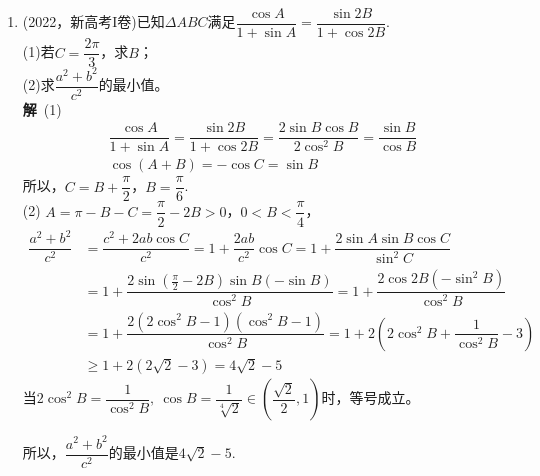 \begin{enumerate}[label={【\textbf{例\thechapter.\arabic*}】},
 leftmargin=\inteval{\myenumleftmargin}pt,
 itemsep=\inteval{\myenumitempsep}pt,
 itemindent=\inteval{\myenumitemindent}pt]
\item (2022，新高考I卷)已知$ \Delta ABC $满足$ \dfrac{\cos A}{1+\sin A}=
\dfrac{\sin 2B}{1+\cos 2B} $. \\
(1)若$ C=\dfrac{2\pi}{3} $，求$ B $；\\
(2)求$ \dfrac{a^{2}+b^{2}}{c^{2}} $的最小值。\\
\textbf{解}\ (1) 
\begin{gather*}
    \dfrac{\cos A}{1+\sin A}=\dfrac{\sin 2B}{1+\cos 2B}=
    \dfrac{2\sin B\cos B}{2\cos^2 B}=\dfrac{\sin B}{\cos B} \\
    \cos(A+B)=-\cos C=\sin B 
\end{gather*}
所以，$ C=B+\dfrac{\pi}{2} $，$ B=\dfrac{\pi}{6} $. \\
(2) $ A=\pi-B-C=\dfrac{\pi}{2}-2B>0 $，$ 0<B<\dfrac{\pi}{4} $，
\begin{align*}
    \dfrac{a^{2}+b^{2}}{c^{2}} &=\dfrac{c^2+2ab\cos C}{c^2}
    =1+\dfrac{2ab}{c^2}\cos C=1+\dfrac{2\sin A\sin B\cos C}{\sin^2 C} \\
    &=1+\dfrac{2\sin(\frac{\pi}{2}-2B)\sin B(-\sin B)}{\cos^2 B}
    =1+\dfrac{2\cos2B(-\sin^2 B)}{\cos^2 B} \\
    &=1+\dfrac{2(2\cos^2 B-1)(\cos^2B-1)}{\cos^2 B}
    =1+2\left(2\cos^2 B+\dfrac{1}{\cos^2B}-3\right) \\
    &\geq 1+2(2\sqrt{2}-3)=4\sqrt{2}-5
\end{align*}
当$ 2\cos^2 B=\dfrac{1}{\cos^2B},\ \cos B=\dfrac{1}{\sqrt[4]{2}}\in 
\left(\dfrac{\sqrt{2}}{2},1\right) $时，等号成立。

所以，$ \dfrac{a^{2}+b^{2}}{c^{2}} $的最小值是$ 4\sqrt{2}-5 $. 


\end{enumerate}
